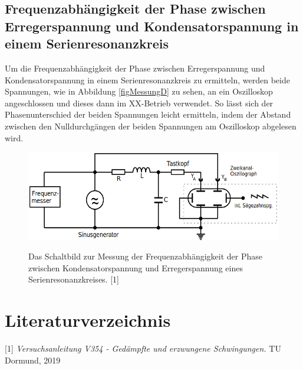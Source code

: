 \documentclass[titlepage = firstcover]{scrartcl}
\begin{document}
        \subsection{Frequenzabhängigkeit der Phase zwischen Erregerspannung und Kondensatorspannung in einem Serienresonanzkreis}
            Um die Frequenzabhängigkeit der Phase zwischen Erregerspannung und Kondensatorspannung in einem Serienresonanzkreis zu ermitteln, werden beide 
            Spannungen, wie in Abbildung \ref{figMessungD} zu sehen, an ein Oszilloskop angeschlossen und dieses dann im XX-Betrieb verwendet. So lässt sich der Phasenunterschied der beiden Spannungen leicht ermitteln, indem der Abstand zwischen den Nulldurchgängen der beiden Spannungen am Oszilloskop
            abgelesen wird.
            \begin{figure}[h]
                \centering
                \caption{Das Schaltbild zur Messung der Frequenzabhängigkeit der Phase zwischen Kondensatorspannung und Erregerspannung eines Serienresonanzkreises. [1]}
                \includegraphics[width = 0.4\linewidth]{MessungD.png}
                \label{fig:MessungD}
              \end{figure}
              \FloatBarrier

    \section{Literaturverzeichnis}
        [1] \textit{Versuchsanleitung V354 - Gedämpfte und erzwungene Schwingungen.} TU Dormund, 2019
             
\end{document}
